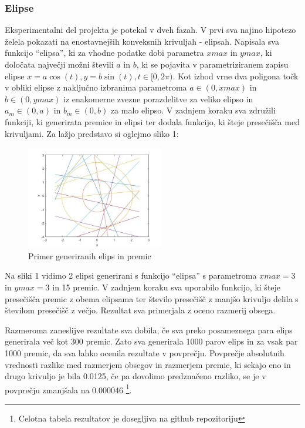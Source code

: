 \documentclass[a4paper]{article}
\begin{document}
\subsubsection{Elipse}
Eksperimentalni del projekta je potekal v dveh fazah. V prvi sva najino hipotezo želela pokazati na enostavnejših konveksnih krivuljah - elipsah. Napisala sva funkcijo ``elipsa'', ki za vhodne podatke dobi parametra $xmax$ in $ymax$, ki določata največji možni števili $a$ in $b$, ki se pojavita v parametriziranem zapisu elipse $x=a \cos(t), y=b \sin(t), t\in [0, 2\pi)$. Kot izhod vrne dva poligona točk v obliki elipse z naključno izbranima parametroma $a \in (0, xmax)$ in $b \in (0, ymax)$ iz enakomerne zvezne porazdelitve za veliko elipso in $a_m \in (0, a)$ in $b_m \in (0, b)$ za malo elipso. V zadnjem koraku sva združili funkciji, ki generirata premice in elipsi ter dodala funkcijo, ki šteje presečišča med krivuljami. Za lažjo predstavo si oglejmo sliko 1:


\begin{figure}[h]
\centering
\includegraphics[width=60mm]{graf_primer.jpg}
\caption{Primer generiranih elips in premic \label{overflow}}
\end{figure} 

Na sliki 1 vidimo 2 elipsi generirani s funkcijo ``elipsa'' s parametroma $xmax=3$ in $ymax=3$ in 15 premic. V zadnjem koraku sva uporabilo funkcijo, ki šteje presečišča premic z obema elipsama ter število presečišč z manjšo krivuljo delila s številom presečišč z večjo. Rezultat sva primerjala z oceno razmerij obsega. 




Razmeroma zaneslijve rezultate sva dobila, če sva preko posameznega para elips generirala več kot 300 premic. Zato sva generirala 1000 parov elips in za vsak par 1000 premic, da sva lahko ocenila rezultate v povprečju. Povprečje absolutnih vrednosti razlike med razmerjem obsegov in razmerjem premic, ki sekajo eno in drugo krivuljo je bila 0.0125, če pa dovolimo predznačeno razliko, se je v povprečju zmanjšala na 0.000046 \footnote[1]{Celotna tabela rezultatov je dosegljiva na github repozitoriju}.
\end{document}
